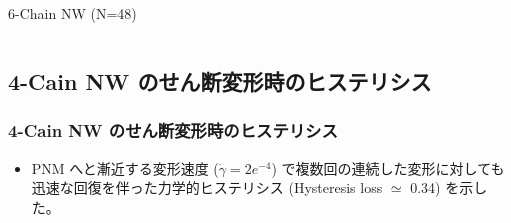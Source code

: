 \documentclass[12pt, dvipdfmx]{beamer}
\begin{document}
\begin{frame}
\begin{columns}[T, onlytextwidth]
		6-Chain NW (N=48)
	\end{columns}
\end{frame}

\subsection{4-Cain NW のせん断変形時のヒステリシス}
\begin{frame}
	\frametitle{4-Cain NW のせん断変形時のヒステリシス}
	\begin{itemize}
		\item PNM へと漸近する変形速度 ($\dot{\gamma} = 2e^{-4}$) で複数回の連続した変形に対しても迅速な回復を伴った力学的ヒステリシス (Hysteresis loss $\simeq$ 0.34) を示した。
	\end{itemize}


\end{frame}
\end{document}
